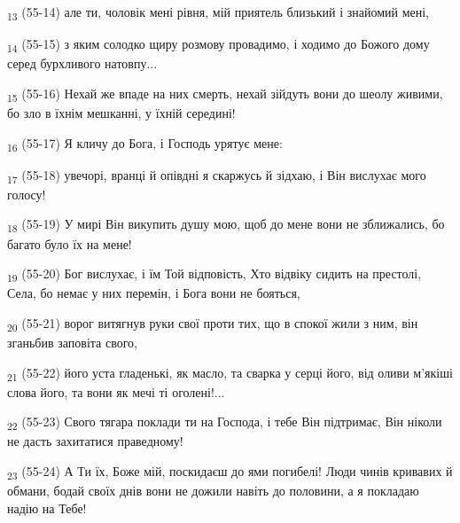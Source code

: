 \begin{tcolorbox}
\textsubscript{13} (55-14) але ти, чоловік мені рівня, мій приятель близький і знайомий мені,
\end{tcolorbox}
\begin{tcolorbox}
\textsubscript{14} (55-15) з яким солодко щиру розмову провадимо, і ходимо до Божого дому серед бурхливого натовпу...
\end{tcolorbox}
\begin{tcolorbox}
\textsubscript{15} (55-16) Нехай же впаде на них смерть, нехай зійдуть вони до шеолу живими, бо зло в їхнім мешканні, у їхній середині!
\end{tcolorbox}
\begin{tcolorbox}
\textsubscript{16} (55-17) Я кличу до Бога, і Господь урятує мене:
\end{tcolorbox}
\begin{tcolorbox}
\textsubscript{17} (55-18) увечорі, вранці й опівдні я скаржусь й зідхаю, і Він вислухає мого голосу!
\end{tcolorbox}
\begin{tcolorbox}
\textsubscript{18} (55-19) У мирі Він викупить душу мою, щоб до мене вони не зближались, бо багато було їх на мене!
\end{tcolorbox}
\begin{tcolorbox}
\textsubscript{19} (55-20) Бог вислухає, і їм Той відповість, Хто відвіку сидить на престолі, Села, бо немає у них перемін, і Бога вони не бояться,
\end{tcolorbox}
\begin{tcolorbox}
\textsubscript{20} (55-21) ворог витягнув руки свої проти тих, що в спокої жили з ним, він зганьбив заповіта свого,
\end{tcolorbox}
\begin{tcolorbox}
\textsubscript{21} (55-22) його уста гладенькі, як масло, та сварка у серці його, від оливи м'якіші слова його, та вони як мечі ті оголені!...
\end{tcolorbox}
\begin{tcolorbox}
\textsubscript{22} (55-23) Свого тягара поклади ти на Господа, і тебе Він підтримає, Він ніколи не дасть захитатися праведному!
\end{tcolorbox}
\begin{tcolorbox}
\textsubscript{23} (55-24) А Ти їх, Боже мій, поскидаєш до ями погибелі! Люди чинів кривавих й обмани, бодай своїх днів вони не дожили навіть до половини, а я покладаю надію на Тебе!
\end{tcolorbox}
